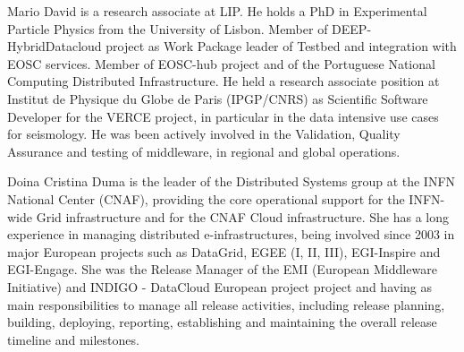 \documentclass[journal]{IEEEtran}
\begin{document}
\begin{IEEEbiography}{Mario David}
is a research associate at LIP. He holds a PhD in Experimental Particle Physics from the University of Lisbon.
Member of DEEP-HybridDatacloud project as Work Package leader of Testbed and integration with EOSC services. Member of EOSC-hub project and
of the Portuguese National Computing Distributed Infrastructure.
He held a research associate position at Institut de Physique du Globe de Paris (IPGP/CNRS) as Scientific Software Developer for the VERCE project, in particular in the data intensive use cases for seismology.
He was been actively involved in the Validation, Quality Assurance and testing of middleware, in regional and global operations.
\end{IEEEbiography}

\begin{IEEEbiography}{Doina Cristina Duma}
is the leader of the Distributed Systems group at the INFN National Center (CNAF), providing the core operational support for the INFN-wide Grid infrastructure and for the CNAF Cloud infrastructure. She has a long experience in managing distributed e-infrastructures, being involved since 2003 in major European projects such as DataGrid, EGEE (I, II, III), EGI-Inspire and EGI-Engage. She was the Release Manager of the EMI (European Middleware Initiative) and INDIGO - DataCloud European project project and having as main responsibilities to manage all release activities, including release planning, building, deploying, reporting, establishing and maintaining the overall release timeline and milestones.
\end{IEEEbiography}
\end{document}
